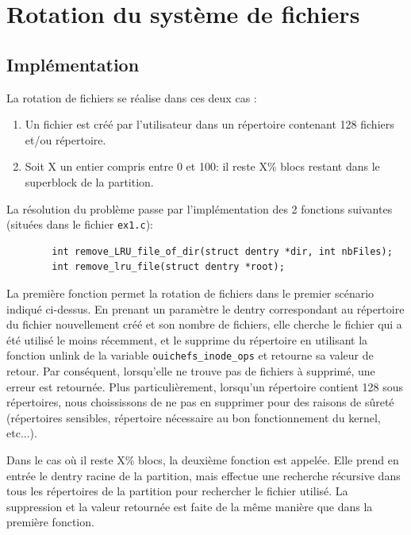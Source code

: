 \documentclass{article}
\begin{document}
	\section{Rotation du système de fichiers}
	\subsection{Implémentation}

    La rotation de fichiers se réalise dans ces deux cas :
	\begin{enumerate}
        \item Un fichier est créé par l'utilisateur dans un répertoire contenant 128 fichiers et/ou répertoire.
        \item Soit X un entier compris entre 0 et 100: il reste X\% blocs restant dans le superblock de la partition.
        \newline
    \end{enumerate}
    La résolution du problème passe par l'implémentation des 2 fonctions suivantes (situées dans le fichier \verb|ex1.c|):
	\begin{lstlisting}
		int remove_LRU_file_of_dir(struct dentry *dir, int nbFiles);
		int remove_lru_file(struct dentry *root);
	\end{lstlisting}

	La première fonction permet la rotation de fichiers dans le premier scénario indiqué ci-dessus. En prenant un paramètre le dentry correspondant au répertoire du fichier nouvellement créé et son nombre de fichiers, elle cherche le fichier qui a été utilisé le moins récemment, et le supprime du répertoire en utilisant la fonction unlink de la variable \verb|ouichefs_inode_ops| et retourne sa valeur de retour. Par conséquent, lorsqu'elle ne trouve pas de fichiers à supprimé, une erreur est retournée. Plus particulièrement, lorsqu'un répertoire contient 128 sous répertoires, nous choississons de ne pas en supprimer pour des raisons de sûreté (répertoires sensibles, répertoire nécessaire au bon fonctionnement du kernel, etc...).\newline


	Dans le cas où il reste X\% blocs, la deuxième fonction est appelée. Elle prend en entrée le dentry racine de la partition, mais effectue une recherche récursive dans tous les répertoires de la partition pour rechercher le fichier utilisé. La suppression et la valeur retournée est faite de la même manière que dans la première fonction.\newline
\end{document}
